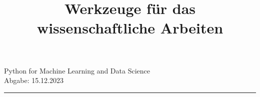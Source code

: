 \documentclass[
oneside,
12pt,
a4paper,
parskip=full
]{scrartcl}
\begin{document}
 \title{Werkzeuge für das wissenschaftliche Arbeiten}
 \maketitle
\normalsize Python for Machine Learning and Data Science\\
\normalfont Abgabe: 15.12.2023\\

\tableofcontents
\hrule\hfill\\[0.2cm]
\end{document}
